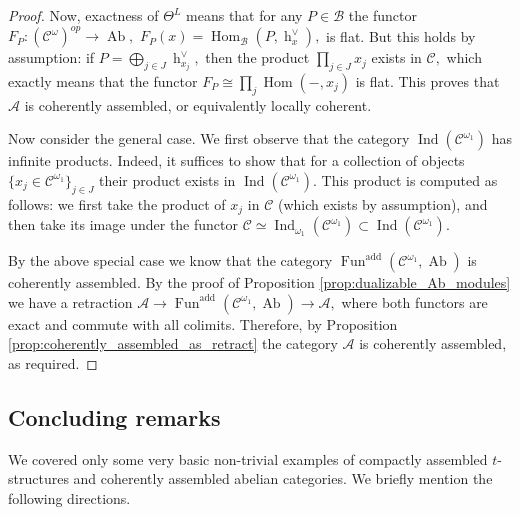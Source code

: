 \documentclass[11pt,leqno]{amsart}
\numberwithin{equation}{section}
\def\h{\operatorname{h}}
\def\Hom{\operatorname{Hom}}
\newcommand{\biggplus}[1][]{\mathop{\bigoplus}\limits_{#1}}
\newcommand{\prodd}[1][]{\mathop{\prod}\limits_{#1}}
\newcommand{\cA}{{\mathcal A}}
\newcommand{\cB}{{\mathcal B}}
\newcommand{\cC}{{\mathcal C}}
\newcommand{\Fun}{\operatorname{Fun}}
\newcommand{\Ab}{\operatorname{Ab}}
\newcommand{\add}{\operatorname{add}}
\newcommand{\Ind}{\operatorname{Ind}}
\begin{document}
\begin{proof}
Now, exactness of $\Theta^L$ means that for any $P\in\cB$ the functor $F_P:(\cC^{\omega})^{op}\to\Ab,$ $F_P(x)=\Hom_{\cB}(P,\h_x^{\vee}),$ is flat. But this holds by assumption: if $P=\biggplus[j\in J]\h_{x_j}^{\vee},$ then the product $\prodd[j\in J]x_j$ exists in $\cC,$ which exactly means that the functor $F_P\cong \prodd[j]\Hom(-,x_j)$ is flat. This proves that $\cA$ is coherently assembled, or equivalently locally coherent.

Now consider the general case. We first observe that the category $\Ind(\cC^{\omega_1})$ has infinite products. Indeed, it suffices to show that for a collection of objects $\{x_j\in\cC^{\omega_1}\}_{j\in J}$ their product exists in $\Ind(\cC^{\omega_1}).$ This product is computed as follows: we first take the product of $x_j$ in $\cC$ (which exists by assumption), and then take its image under the functor $\cC\simeq\Ind_{\omega_1}(\cC^{\omega_1})\subset\Ind(\cC^{\omega_1}).$

By the above special case we know that the category $\Fun^{\add}(\cC^{\omega_1},\Ab)$ is coherently assembled. By the proof of Proposition \ref{prop:dualizable_Ab_modules} we have a retraction $\cA\to\Fun^{\add}(\cC^{\omega_1},\Ab)\to\cA,$ where both functors are exact and commute with all colimits. Therefore, by Proposition \ref{prop:coherently_assembled_as_retract} the category $\cA$ is coherently assembled, as required.
\end{proof}

\subsection{Concluding remarks}
\label{ssec:concluding_remarks}

We covered only some very basic non-trivial examples of compactly assembled $t$-structures and coherently assembled abelian categories. We briefly mention the following directions.
\end{document}
